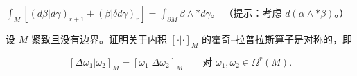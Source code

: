 \begin{exercises}
\begin{subitems}
\item

$ \int_M[(d\beta|d\gamma)_{r+1} + (\beta|\delta d\gamma)_r] = \int_{\partial M}\beta\wedge\ast d\gamma $。
（提示：考虑 $ d(\alpha\wedge\ast\beta) $。）

\end{subitems}

\item

设 $ M $ 紧致且没有边界。证明关于内积 $ [\cdot|\cdot]_M $ 的霍奇–拉普拉斯算子是对称的，即

\[
[\Delta\omega_1|\omega_2]_M = [\omega_1|\Delta\omega_2]_M \qquad \text{对 } \omega_1,\omega_2 \in \Omega^r(M).
\]
\end{exercises}
